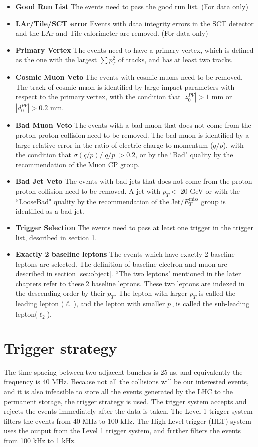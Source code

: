 \begin{itemize}
\item \textbf{Good Run List} The events need to pass the good run list. (For data only)
\item \textbf{LAr/Tile/SCT error} Events with data integrity errors in the SCT detector and the LAr and Tile calorimeter are removed. (For data only)
\item \textbf{Primary Vertex} The events need to have a primary vertex, which is defined as the one with the largest $\sum p_{T}^{2}$ of tracks, and has at least two tracks.
\item \textbf{Cosmic Muon Veto} The events with cosmic muons need to be removed. The track of cosmic muon is identified by large impact parameters with respect to the primary vertex, with the condition that $|z_{0}^{PV}|>1$ mm or $|d_{0}^{PV}|>0.2$ mm.
\item \textbf{Bad Muon Veto} The events with a bad muon that does not come from the proton-proton collision need to be removed. The bad muon is identified by a large relative error in the ratio of electric charge to momentum ($q/p$), with the condition that $\sigma(q/p) / |q/p| > 0.2$, or by the ``Bad" quality by the recommendation of the Muon CP group.
\item \textbf{Bad Jet Veto} The events with bad jets that does not come from the proton-proton collision need to be removed. A jet with $p_{T}<$ 20 GeV or with the ``LooseBad" quality by the recommendation of the Jet/$E_T^{\text{miss}}$ group is identified as a bad jet.
\item \textbf{Trigger Selection} The events need to pass at least one trigger in the trigger list, described in section \ref{sec:trigger}.
\item \textbf{Exactly 2 baseline leptons} The events which have exactly 2 baseline leptons are selected. The definition of baseline electron and muon are described in section \ref{sec:object}. ``The two leptons" mentioned in the later chapters refer to these 2 baseline leptons. These two leptons are indexed in the descending order by their $p_T$. The lepton with larger $p_T$ is called the leading lepton ($\ell_1$), and the lepton with smaller $p_T$ is called the sub-leading lepton($\ell_2$).
\end{itemize}

\section{Trigger strategy}
\label{sec:trigger}
The time-spacing between two adjacent bunches is 25 ns, and equivalently the frequency is 40 MHz.
Because not all the collisions will be our interested events, and it is also infeasible to store all the events generated by the LHC to the permanent storage, the trigger strategy is used.
The trigger system accepts and rejects the events immediately after the data is taken.
The Level 1 trigger system filters the events from 40 MHz to 100 kHz.
The High Level trigger (HLT) system uses the output from the Level 1 trigger system, and further filters the events from 100 kHz to 1 kHz.

